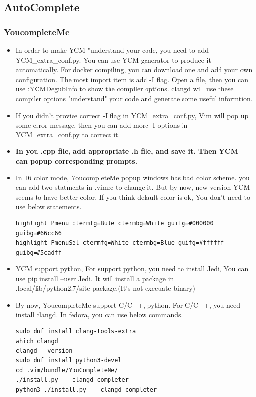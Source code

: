 \documentclass[a4paper,11pt,twoside]{book}
\begin{document}
\subsection{AutoComplete}
\subsubsection{YoucompleteMe}

\begin{itemize}
		\item In order to make YCM "understand your code, you need to add YCM\_extra\_conf.py. You can use YCM generator to produce it automatically. For docker compiling, you can download one and add your own configuration. The most import item is add -I flag. Open a file, then you can use :YCMDegubInfo to show the compiler options. clangd will use these compiler options "understand" your code and generate some useful informtion.

		\item If you didn't provice correct -I flag in YCM\_extra\_conf.py, Vim will pop up some error message, then you can add more -I options in YCM\_extra\_conf.py to correct it.

		\item \textbf{In you .cpp file, add appropriate .h file, and save it. Then YCM can  popup corresponding prompts.} 

		\item In 16 color mode, YoucompleteMe popup windows has bad color scheme. you can add two statments in .vimrc to change it. But by now, new version YCM seems to have better color. If you think default color is ok, You don't need to use below statements. 
\begin{verbatim}
highlight Pmenu ctermfg=Bule ctermbg=White guifg=#000000 guibg=#66cc66
highlight PmenuSel ctermfg=White ctermbg=Blue guifg=#ffffff guibg=#5cadff
\end{verbatim}

		\item YCM support python, For support python, you need to install Jedi, You can use pip install --user Jedi.	It will install a package in .local/lib/python2.7/site-package.(It's not execuate binary)	

		\item By now, YoucompleteMe support C/C++, python. For C/C++, you need install clangd. In fedora, you can use below commands.
\begin{verbatim}
sudo dnf install clang-tools-extra
which clangd
clangd --version
sudo dnf install python3-devel
cd .vim/bundle/YouCompleteMe/
./install.py  --clangd-completer
python3 ./install.py  --clangd-completer
\end{verbatim}	


\end{itemize}
\end{document}
